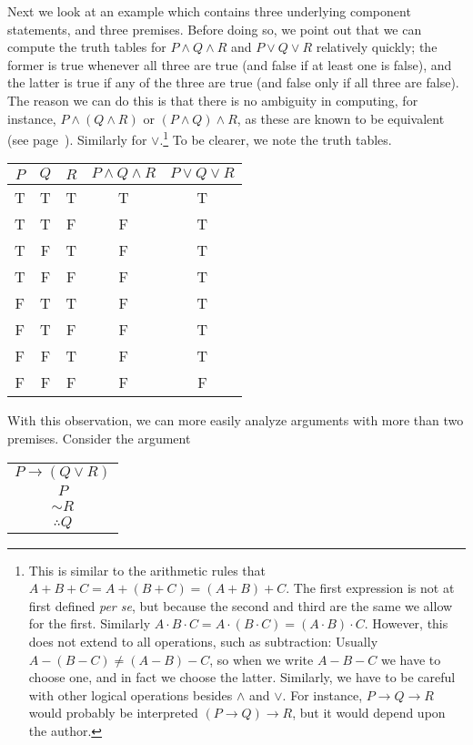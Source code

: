 Next we look at an example which contains three underlying 
component statements, and three premises.  Before doing so, we 
point out that we can compute the truth tables for 
$P\wedge Q\wedge R$ and $P\vee Q\vee R$ relatively quickly;
the former is true whenever all three are true (and false
if at least one is false), and the latter
is true if any of the three are true (and false only if all
three are false).  The reason we can do this is that
there is no ambiguity in computing, for instance,
$P\wedge(Q\wedge R)$ or $(P\wedge Q)\wedge R$, as these
are known to be equivalent (see page~\pageref{wedgeoverwedge}).
Similarly for $\vee$.\footnote{%
This is similar to the arithmetic rules that 
$A+B+C=A+(B+C)=(A+B)+C$.  The first expression is not
at first defined {\it per se}, but because the second and third
are the same we allow for the first.  Similarly 
$A\cdot B\cdot C=A\cdot(B\cdot C)=(A\cdot B)\cdot C$.
However, this does not extend to all operations, such as subtraction:
Usually
$A-(B-C)\ne(A-B)-C$, so when we write $A-B-C$ we have to choose one,
and in fact we choose the latter.
Similarly, we have to be careful with other logical operations
besides $\wedge$ and $\vee$.
For instance, $P\longrightarrow Q\longrightarrow R$ would
probably be interpreted $(P\longrightarrow Q)\longrightarrow R$,
but it would depend upon the author.%
}
To be clearer, we note the truth tables.
\begin{center}
\begin{tabular}{|c|c|c||c|c|}
\hline
$P$&$Q$&$R$&$P\wedge Q\wedge R$&$P\vee Q\vee R$\\
\hline
T&T&T&T&T\\
T&T&F&F&T\\
T&F&T&F&T\\
T&F&F&F&T\\ \hline
F&T&T&F&T\\
F&T&F&F&T\\
F&F&T&F&T\\
F&F&F&F&F\\\hline
\end{tabular}
\end{center}
With this observation, we can more easily analyze arguments
with more than two premises.
\bex Consider the argument 
\begin{center}
\begin{tabular}{c}
$P\longrightarrow (Q\vee R)$\\
$P$\\
$\sim R$\\\hline
$\therefore Q$
\end{tabular}\end{center}
